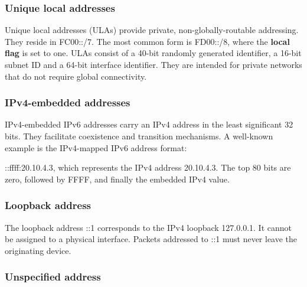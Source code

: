 \subsubsection*{Unique local addresses}

Unique local addresses (ULAs) provide private, non-globally-routable addressing. They reside in FC00::/7. The most common form is FD00::/8, where the \textbf{local flag} is set to one. ULAs consist of a 40-bit randomly generated identifier, a 16-bit subnet ID and a 64-bit interface identifier. They are intended for private networks that do not require global connectivity.

\begin{center}
\end{center}

\subsubsection*{IPv4-embedded addresses}

IPv4-embedded IPv6 addresses carry an IPv4 address in the least significant 32 bits. They facilitate coexistence and transition mechanisms. A well-known example is the IPv4-mapped IPv6 address format:

::ffff:20.10.4.3, which represents the IPv4 address 20.10.4.3. The top 80 bits are zero, followed by FFFF, and finally the embedded IPv4 value.

\begin{center}
\end{center}

\subsubsection*{Loopback address}

The loopback address ::1 corresponds to the IPv4 loopback 127.0.0.1. It cannot be assigned to a physical interface. Packets addressed to ::1 must never leave the originating device.

\subsubsection*{Unspecified address}

